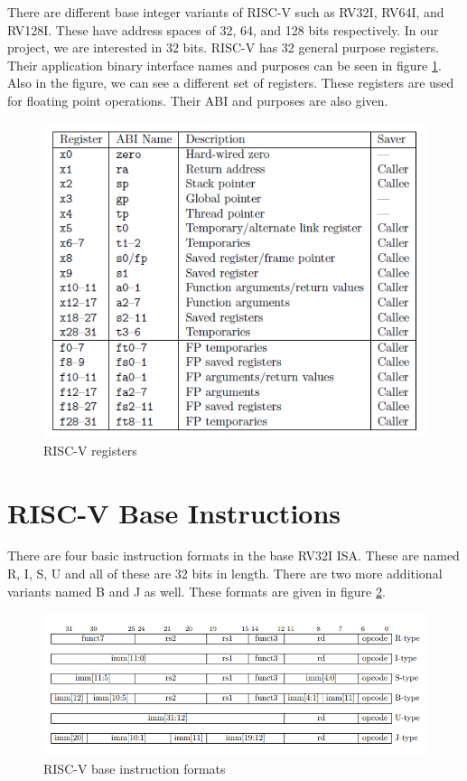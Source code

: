 There are different base integer variants of RISC-V such as RV32I, RV64I, and RV128I. These have address spaces of 32, 64, and 128 bits respectively. \cite{Altinayozlem} In our project, we are interested in 32 bits. RISC-V has 32 general purpose registers. Their application binary interface names and purposes can be seen in figure \ref{fig:riscv_registers}. Also in the figure, we can see a different set of registers. These registers are used for floating point operations. Their ABI and purposes are also given.

\begin{figure}[h!]
    \centering
    \includegraphics{riscv/riscv_registers.png}
    \caption{RISC-V registers \cite{rvregisters}}
    \label{fig:riscv_registers}
\end{figure}

\section{RISC-V Base Instructions}
There are four basic instruction formats in the base RV32I ISA. These are named R, I, S, U and all of these are 32 bits in length. There are two more additional variants named B and J as well.\cite{rvmanual} These formats are given in figure \ref{fig:risc-v_base_instruction_formats}.
\begin{figure}
    \centering
    \includegraphics{riscv/riscv_base_instruction_formats.png}
    \caption{RISC-V base instruction formats \cite{rvmanual}}
    \label{fig:risc-v_base_instruction_formats}
\end{figure}

